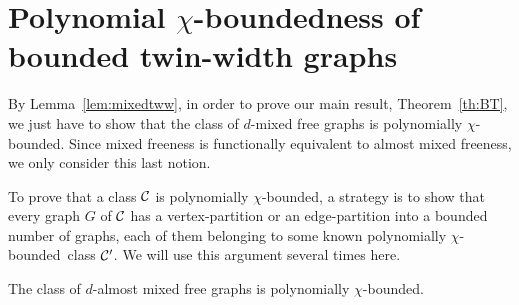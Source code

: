 \documentclass[11pt]{article}
\numberwithin{equation}{section}
\newcommand{\pcb}{polynomially $\chi$-bounded}
\begin{document}
\section{Polynomial $\chi$-boundedness of bounded twin-width graphs}

By Lemma~\ref{lem:mixedtww}, in order to prove our main result, Theorem~\ref{th:BT}, we just have to show that the class of $d$-mixed free graphs is polynomially $\chi$-bounded. Since mixed freeness is functionally
equivalent to almost mixed freeness, we only consider this last notion.


To prove that a class $\cal C$ is \pcb, a strategy is to show that every graph $G$ of $\cal C$ has a vertex-partition or an edge-partition into a bounded number of graphs, each of them belonging to some known \pcb~class $\cal C '$. We will use this argument several times here.

\begin{theorem}\label{thm:damf-pcb} The class of $d$-almost mixed free graphs is \pcb.
\end{theorem}
\end{document}
